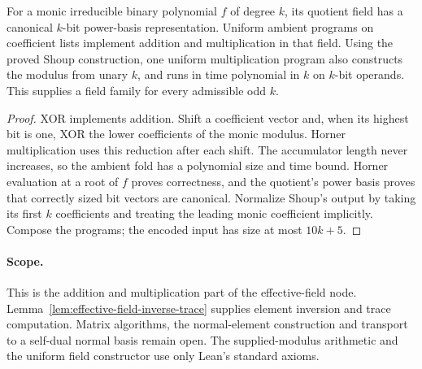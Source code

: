 \begin{lemma}
\label{lem:effective-binary-field-arithmetic}
\leanok
For a monic irreducible binary polynomial $f$ of degree $k$, its quotient field
has a canonical $k$-bit power-basis representation. Uniform ambient programs on
coefficient lists implement addition and multiplication in that field.
Using the proved Shoup construction, one uniform multiplication program
also constructs the modulus from unary $k$, and runs in time polynomial in $k$
on $k$-bit operands. This supplies a field family for every admissible odd $k$.
\end{lemma}
\begin{proof}
\leanok
XOR implements addition. Shift a coefficient vector and, when its highest bit
is one, XOR the lower coefficients of the monic modulus. Horner multiplication
uses this reduction after each shift. The accumulator length never increases,
so the ambient fold has a polynomial size and time bound. Horner evaluation
at a root of $f$ proves correctness, and the quotient's power basis proves
that correctly sized bit vectors are canonical. Normalize Shoup's output by
taking its first $k$ coefficients and treating the leading monic coefficient
implicitly. Compose the programs; the encoded input has size at most $10k+5$.
\end{proof}
\paragraph{Scope.} This is the addition and multiplication part of the
effective-field node. Lemma~\ref{lem:effective-field-inverse-trace} supplies element
inversion and trace computation. Matrix algorithms, the normal-element construction
and transport to a self-dual normal basis remain open.
The supplied-modulus arithmetic and the uniform field constructor use only Lean's standard axioms.

